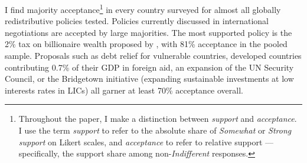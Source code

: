 \documentclass[12pt,english]{article}
\begin{document}
\begin{bibunit}


I find majority acceptance\footnote{Throughout the paper, I make a distinction between \textit{support} and \textit{acceptance}. I use the term \textit{support} to refer to the absolute share of \textit{Somewhat} or \textit{Strong support} on Likert scales, and \textit{acceptance} to refer to relative support ---specifically, the support share among non-\textit{Indifferent} responses.} in every country surveyed for almost all globally redistributive policies tested. Policies currently discussed in international negotiations are accepted by large majorities. The most supported %
policy is the 2\% tax on billionaire wealth proposed by \cite{zucman_blueprint_2024}, with 81\% acceptance in the pooled sample. Proposals such as debt relief for vulnerable countries, developed countries contributing 0.7\% of their GDP in foreign aid, an expansion of the UN Security Council, or the Bridgetown initiative (expanding sustainable investments at low interests rates in LICs) all garner at least 70\% acceptance overall. 


\end{bibunit}
\end{document}

